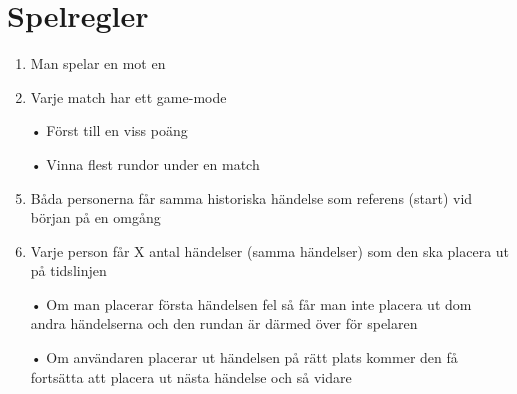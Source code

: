 \documentclass[a4paper,11pt]{article}
\begin{document}
\section{Spelregler}
\begin{enumerate}
\item Man spelar en mot en
\item Varje match har ett game-mode
\item[•] Först till en viss poäng
\item[•] Vinna flest rundor under en match
\item Båda personerna får samma historiska händelse som referens (start) vid början på en omgång
\item Varje person får X antal händelser (samma händelser) som den ska placera ut på tidslinjen
\item[•] Om man placerar första händelsen fel så får man inte placera ut dom andra händelserna och den rundan är därmed över för spelaren
\item[•] Om användaren placerar ut händelsen på rätt plats kommer den få fortsätta att placera ut nästa händelse och så vidare  
\end{enumerate}
\end{document}

